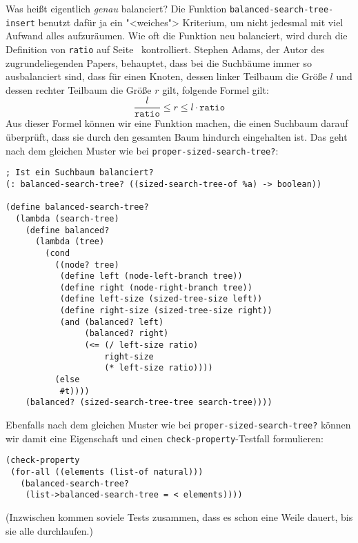 Was heißt eigentlich \emph{genau} balanciert?  Die Funktion
\lstinline{balanced-search-tree-insert} benutzt dafür ja ein
"<weiches"> Kriterium, um nicht jedesmal mit viel Aufwand alles
aufzuräumen.  Wie oft die Funktion neu balanciert, wird durch die
Definition von \lstinline{ratio} auf Seite~\pageref{def:ratio}
kontrolliert.  Stephen Adams, der Autor des zugrundeliegenden Papers,
behauptet, dass bei die Suchbäume immer so ausbalanciert sind, dass
für einen Knoten, dessen linker Teilbaum die Größe $l$
und dessen rechter Teilbaum die Größe $r$ gilt, folgende Formel gilt:
%
\begin{displaymath}
  \frac{l}{\mathtt{ratio}} \leq r \leq l \cdot \mathtt{ratio}
\end{displaymath}
%
Aus dieser Formel können wir eine Funktion machen, die einen Suchbaum
darauf überprüft, dass sie durch den gesamten Baum hindurch
eingehalten ist.  Das geht nach dem gleichen Muster wie bei
\lstinline{proper-sized-search-tree?}:
%
\begin{lstlisting}
; Ist ein Suchbaum balanciert?
(: balanced-search-tree? ((sized-search-tree-of %a) -> boolean))

(define balanced-search-tree?
  (lambda (search-tree)
    (define balanced?
      (lambda (tree)
        (cond
          ((node? tree)
           (define left (node-left-branch tree))
           (define right (node-right-branch tree)) 
           (define left-size (sized-tree-size left))
           (define right-size (sized-tree-size right))
           (and (balanced? left)
                (balanced? right)
                (<= (/ left-size ratio)
                    right-size
                    (* left-size ratio))))
          (else
           #t))))
    (balanced? (sized-search-tree-tree search-tree))))
\end{lstlisting}
%
Ebenfalls nach dem gleichen Muster wie bei
\lstinline{proper-sized-search-tree?} können wir damit eine
Eigenschaft und einen \lstinline{check-property}-Testfall formulieren:
%
\begin{lstlisting}
(check-property
 (for-all ((elements (list-of natural)))
   (balanced-search-tree?
    (list->balanced-search-tree = < elements))))
\end{lstlisting}
%
(Inzwischen kommen soviele Tests zusammen, dass es schon eine Weile
dauert, bis sie alle durchlaufen.)

